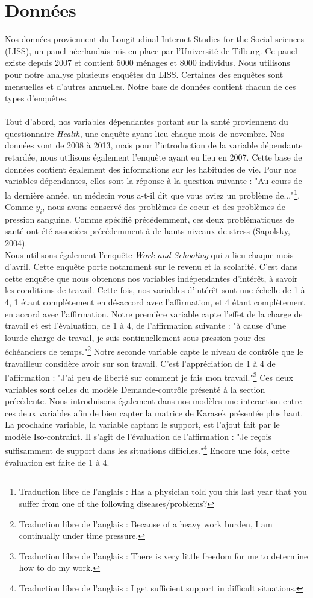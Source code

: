 \documentclass[a4paper, oneside, titlepage]{article}
\begin{document}
\section{Données}
Nos données proviennent du Longitudinal Internet Studies for the Social sciences (LISS), un panel néerlandais mis en place par l'Université de Tilburg. Ce panel existe depuis 2007 et contient 5000 ménages et 8000 individus. Nous utilisons pour notre analyse plusieurs enquêtes du LISS. Certaines des enquêtes sont mensuelles et d'autres annuelles. Notre base de données contient chacun de ces types d'enquêtes.
\\
\\
Tout d'abord, nos variables dépendantes portant sur la santé proviennent du questionnaire \textit{Health}, une enquête ayant lieu chaque mois de novembre. Nos données vont de 2008 à 2013, mais pour l'introduction de la variable dépendante retardée, nous utilisons également l'enquête ayant eu lieu en 2007. Cette base de données contient également des informations sur les habitudes de vie. Pour nos variables dépendantes, elles sont la réponse à la question suivante : "Au cours de la dernière année, un médecin vous a-t-il dit que vous aviez un problème de..."\footnote{Traduction libre de l'anglais : Has a physician told you this last year that you suffer from one of the following diseases/problems?}. Comme $y_i$, nous avons conservé des problèmes de coeur et des problèmes de pression sanguine. Comme spécifié précédemment, ces deux problématiques de santé ont été associées précédemment à de hauts niveaux de stress (Sapolsky, 2004).
\\
Nous utilisons également l'enquête \textit{Work and Schooling} qui a lieu chaque mois d'avril. Cette enquête porte notamment sur le revenu et la scolarité. C'est dans cette enquête que nous obtenons nos variables indépendantes d'intérêt, à savoir les conditions de travail. Cette fois, nos variables d'intérêt sont une échelle de 1 à 4, 1 étant complètement en désaccord avec l'affirmation, et 4 étant complètement en accord avec l'affirmation. Notre première variable capte l'effet de la charge de travail et est l'évaluation, de 1 à 4, de l'affirmation suivante : "à cause d'une lourde charge de travail, je suis continuellement sous pression pour des échéanciers de temps."\footnote{Traduction libre de l'anglais : Because of a heavy work burden, I am continually under time pressure.} Notre seconde variable capte le niveau de contrôle que le travailleur considère avoir sur son travail. C'est l'appréciation de 1 à 4 de l'affirmation : "J'ai peu de liberté sur comment je fais mon travail."\footnote{Traduction libre de l'anglais : There is very little freedom for me to determine how to do my work.} Ces deux variables sont celles du modèle Demande-contrôle présenté à la section précédente. Nous introduisons également dans nos modèles une interaction entre ces deux variables afin de bien capter la matrice de Karasek présentée plus haut. La prochaine variable, la variable captant le support, est l'ajout fait par le modèle Iso-contraint. Il s'agit de l'évaluation de l'affirmation : "Je reçois suffisamment de support dans les situations difficiles."\footnote{Traduction libre de l'anglais : I get sufficient support in difficult situations.} Encore une fois, cette évaluation est faite de 1 à 4.
\end{document}
